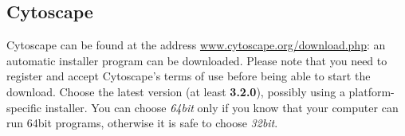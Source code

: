 \documentclass{article}
\begin{document}
\subsection{Cytoscape}\label{sec:install-cytoscape}
Cytoscape can be found at the address \url{www.cytoscape.org/download.php}: an automatic installer
program can be downloaded. Please note that you need to register and accept Cytoscape's terms of use
before being able to start the download.
Choose the latest version (at least {\bf 3.2.0}),
possibly using a platform-specific installer. You can choose \emph{64bit} only
if you know that your computer can run 64bit programs, otherwise it is safe to choose \emph{32bit}.
\end{document}
